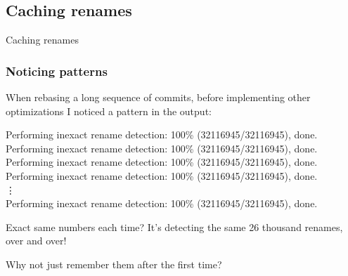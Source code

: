 \documentclass[compress,t]{beamer}
\begin{document}
\subsection[Caching]{Caching renames}

\begin{frame}
  \vfill
  \vspace*{2\baselineskip}
  {\Huge
  \begin{center}Caching renames\end{center}
  }
  \vfill
\end{frame}


\begin{frame}
  \frametitle{Noticing patterns}

  When rebasing a long sequence of commits, before implementing other
  optimizations I noticed a pattern in the output:
  
  \vspace*{1.0\baselineskip}
  \qquad
  \begin{minipage}{0.8\textwidth}
    {\scriptsize
    Performing inexact rename detection: 100\% (32116945/32116945), done.\\
    Performing inexact rename detection: 100\% (32116945/32116945), done.\\
    Performing inexact rename detection: 100\% (32116945/32116945), done.\\
    Performing inexact rename detection: 100\% (32116945/32116945), done.\\
    \hspace*{0.4\textwidth}\vdots\\
    Performing inexact rename detection: 100\% (32116945/32116945), done.
    }
  \end{minipage}

  \pause
  \vspace*{1.0\baselineskip}
  Exact same numbers each time?  It's detecting the same 26 thousand
  renames, over and over!

  \pause
  \vspace*{1.0\baselineskip}
  Why not just remember them after the first time?

\end{frame}

\end{document}
